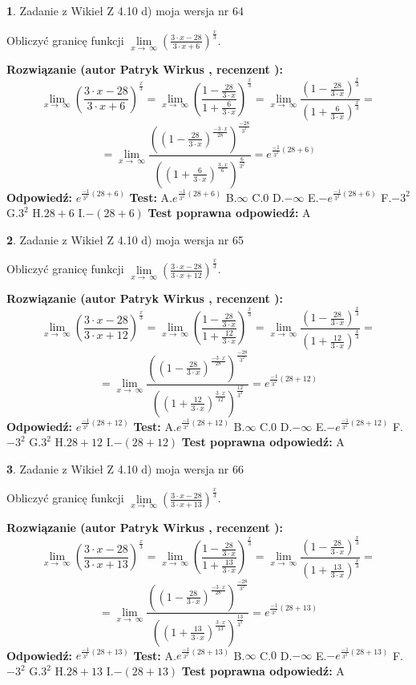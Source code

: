 \documentclass[12pt, a4paper]{article}
\theoremstyle{definition} %
\newtheorem{zad}{}
\newcommand{\zadStart}[1]{\begin{zad}#1\newline}
\newcommand{\zadStop}{\end{zad}}
\newcommand{\rozwStart}[2]{\noindent \textbf{Rozwiązanie (autor #1 , recenzent #2): }\newline}
\newcommand{\rozwStop}{\newline}
\newcommand{\odpStart}{\noindent \textbf{Odpowiedź:}\newline}
\newcommand{\odpStop}{\newline}
\newcommand{\testStart}{\noindent \textbf{Test:}\newline}
\newcommand{\testStop}{\newline}
\newcommand{\kluczStart}{\noindent \textbf{Test poprawna odpowiedź:}\newline}
\newcommand{\kluczStop}{\newline}
\begin{document}
\zadStart{Zadanie z Wikieł Z 4.10 d) moja wersja nr 64}


Obliczyć granicę funkcji  $\lim\limits_{x\to\ \infty}(\frac{3\cdot x-28}{3\cdot x+6})^{\frac{x}{3}}$.
\zadStop
\rozwStart{Patryk Wirkus}{}
$$\lim\limits_{x\to\ \infty}(\frac{3\cdot x-28}{3\cdot x+6})^{\frac{x}{3}} = \lim\limits_{x\to\ \infty}(\frac{1-\frac{28}{3\cdot x}}{1+\frac{6}{3\cdot x}})^{\frac{x}{3}}=\lim\limits_{x\to\ \infty}\frac{(1-\frac{28}{3\cdot x})^{\frac{x}{3}}}{(1+\frac{6}{3\cdot x})^{\frac{x}{3}}}=$$
$$=\lim\limits_{x\to\ \infty}\frac{((1-\frac{28}{3\cdot x})^{\frac{-3\cdot x}{28}})^{\frac{-28}{3^{2}}}}{((1+\frac{6}{3\cdot x})^{\frac{3\cdot x}{6}})^{\frac{6}{3^{2}}}}=e^{\frac{-1}{3^{2}}(28+6)}$$
\rozwStop
\odpStart
$e^{\frac{-1}{3^{2}}(28+6)}$
\odpStop
\testStart
A.$e^{\frac{-1}{3^{2}}(28+6)}$ B.$\infty$ C.$0$ D.$-\infty$ E.$-e^{\frac{-1}{3^{2}}(28+6)}$
F.$-3^{2}$ G.$3^{2}$
H.$28+6$
I.$-(28+6)$
\testStop
\kluczStart
A
\kluczStop



\zadStart{Zadanie z Wikieł Z 4.10 d) moja wersja nr 65}


Obliczyć granicę funkcji  $\lim\limits_{x\to\ \infty}(\frac{3\cdot x-28}{3\cdot x+12})^{\frac{x}{3}}$.
\zadStop
\rozwStart{Patryk Wirkus}{}
$$\lim\limits_{x\to\ \infty}(\frac{3\cdot x-28}{3\cdot x+12})^{\frac{x}{3}} = \lim\limits_{x\to\ \infty}(\frac{1-\frac{28}{3\cdot x}}{1+\frac{12}{3\cdot x}})^{\frac{x}{3}}=\lim\limits_{x\to\ \infty}\frac{(1-\frac{28}{3\cdot x})^{\frac{x}{3}}}{(1+\frac{12}{3\cdot x})^{\frac{x}{3}}}=$$
$$=\lim\limits_{x\to\ \infty}\frac{((1-\frac{28}{3\cdot x})^{\frac{-3\cdot x}{28}})^{\frac{-28}{3^{2}}}}{((1+\frac{12}{3\cdot x})^{\frac{3\cdot x}{12}})^{\frac{12}{3^{2}}}}=e^{\frac{-1}{3^{2}}(28+12)}$$
\rozwStop
\odpStart
$e^{\frac{-1}{3^{2}}(28+12)}$
\odpStop
\testStart
A.$e^{\frac{-1}{3^{2}}(28+12)}$ B.$\infty$ C.$0$ D.$-\infty$ E.$-e^{\frac{-1}{3^{2}}(28+12)}$
F.$-3^{2}$ G.$3^{2}$
H.$28+12$
I.$-(28+12)$
\testStop
\kluczStart
A
\kluczStop



\zadStart{Zadanie z Wikieł Z 4.10 d) moja wersja nr 66}


Obliczyć granicę funkcji  $\lim\limits_{x\to\ \infty}(\frac{3\cdot x-28}{3\cdot x+13})^{\frac{x}{3}}$.
\zadStop
\rozwStart{Patryk Wirkus}{}
$$\lim\limits_{x\to\ \infty}(\frac{3\cdot x-28}{3\cdot x+13})^{\frac{x}{3}} = \lim\limits_{x\to\ \infty}(\frac{1-\frac{28}{3\cdot x}}{1+\frac{13}{3\cdot x}})^{\frac{x}{3}}=\lim\limits_{x\to\ \infty}\frac{(1-\frac{28}{3\cdot x})^{\frac{x}{3}}}{(1+\frac{13}{3\cdot x})^{\frac{x}{3}}}=$$
$$=\lim\limits_{x\to\ \infty}\frac{((1-\frac{28}{3\cdot x})^{\frac{-3\cdot x}{28}})^{\frac{-28}{3^{2}}}}{((1+\frac{13}{3\cdot x})^{\frac{3\cdot x}{13}})^{\frac{13}{3^{2}}}}=e^{\frac{-1}{3^{2}}(28+13)}$$
\rozwStop
\odpStart
$e^{\frac{-1}{3^{2}}(28+13)}$
\odpStop
\testStart
A.$e^{\frac{-1}{3^{2}}(28+13)}$ B.$\infty$ C.$0$ D.$-\infty$ E.$-e^{\frac{-1}{3^{2}}(28+13)}$
F.$-3^{2}$ G.$3^{2}$
H.$28+13$
I.$-(28+13)$
\testStop
\kluczStart
A
\kluczStop
\end{document}
